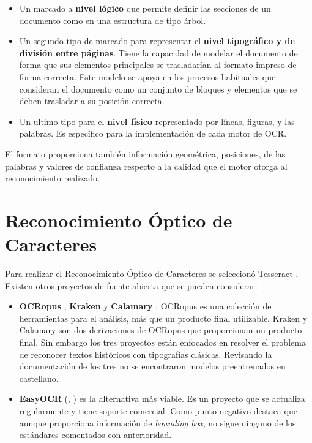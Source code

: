 \begin{itemize}
    \item Un marcado a \textbf{nivel lógico} que permite definir las secciones de un documento como en una estructura de tipo árbol.
    \item Un segundo tipo de marcado para representar el \textbf{nivel tipográfico y de división entre páginas}. Tiene la capacidad de modelar el documento de forma  que sus elementos principales se trasladarían al formato impreso de forma correcta. Este modelo se apoya en los procesos habituales que consideran el documento como un conjunto de bloques y elementos que se deben trasladar a su posición correcta.
    \item Un ultimo tipo para el \textbf{nivel físico} representado por líneas, figuras, y las palabras. Es específico para la implementación de cada motor de OCR. 
\end{itemize}

El formato proporciona también información geométrica, posiciones, de las palabras y valores de confianza respecto a la calidad que el motor otorga al reconocimiento realizado.

\section{Reconocimiento Óptico de Caracteres}
\label{sec:rec-optico-caracteres}

Para realizar el Reconocimiento Óptico de Caracteres se seleccionó Tesseract \cite{ocr_tesseract_raysmithetal.TesseractocrTesseract2021}. Existen otros proyectos de fuente abierta que se pueden considerar:

\begin{itemize}
    \item \textbf{OCRopus} \cite{ocr_ocropus_ocropy_project}, \textbf{Kraken} y \textbf{Calamary} \cite{ocr_calamari_journal}: OCRopus es una colección de herramientas para el análisis, más que un producto final utilizable. Kraken y Calamary son dos derivaciones de OCRopus que proporcionan un producto final. Sin embargo los tres proyectos están enfocados en resolver el problema de reconocer textos históricos con tipografías clásicas. Revisando la documentación de los tres no se encontraron modelos preentrenados en castellano.
    \item \textbf{EasyOCR} (\cite{ocr_easyocr_official}, \cite{ocr_easyocr_project}) es la alternativa más viable. Es un proyecto que se actualiza regularmente y tiene soporte comercial. Como punto negativo destaca que aunque proporciona información de \emph{bounding box}, no sigue ninguno de los estándares comentados con anterioridad.
\end{itemize}

